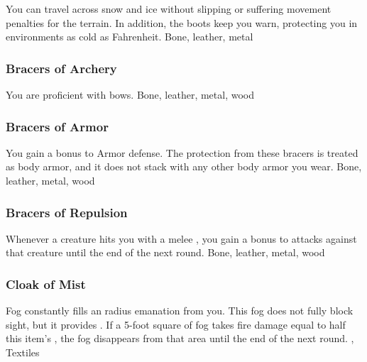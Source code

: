 You can travel across snow and ice without slipping or suffering movement penalties for the terrain.
In addition, the boots keep you warn, protecting you in environments as cold as  Fahrenheit.
 
 Bone, leather, metal
\lowercase{\hypertarget{item:Bracers of Archery}{}}\label{item:Bracers of Archery}
\hypertarget{item:Bracers of Archery}{\subsubsection{Bracers of Archery\hfill{}}}
You are proficient with bows.
 
 Bone, leather, metal, wood
\lowercase{\hypertarget{item:Bracers of Armor}{}}\label{item:Bracers of Armor}
\hypertarget{item:Bracers of Armor}{\subsubsection{Bracers of Armor\hfill{}}}
You gain a  bonus to Armor defense.
The protection from these bracers is treated as body armor, and it does not stack with any other body armor you wear.
 
 Bone, leather, metal, wood
\lowercase{\hypertarget{item:Bracers of Repulsion}{}}\label{item:Bracers of Repulsion}
\hypertarget{item:Bracers of Repulsion}{\subsubsection{Bracers of Repulsion\hfill{}}}
Whenever a creature hits you with a melee , you gain a  bonus to  attacks against that creature until the end of the next round.
 
 Bone, leather, metal, wood
\lowercase{\hypertarget{item:Cloak of Mist}{}}\label{item:Cloak of Mist}
\hypertarget{item:Cloak of Mist}{\subsubsection{Cloak of Mist\hfill{}}}
Fog constantly fills an \areamed radius emanation from you.
This fog does not fully block sight, but it provides \concealment.
If a 5-foot square of fog takes fire damage equal to half this item's , the fog disappears from that area until the end of the next round.
 , 
 Textiles
